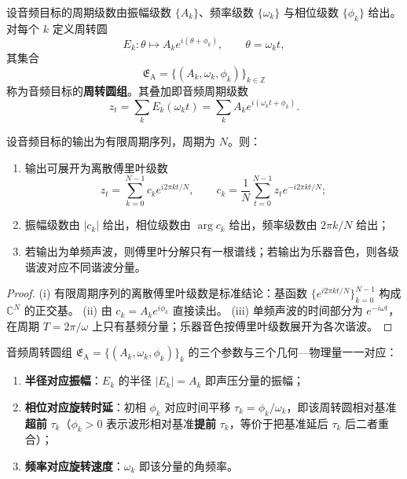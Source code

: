 \begin{definition}[音频周转圆组]\label{def:audio_epicycle_group}
设音频目标的周期级数由振幅级数 $\{A_k\}$、频率级数 $\{\omega_k\}$ 与相位级数 $\{\phi_k\}$ 给出。对每个 $k$ 定义周转圆
\[
E_k:\theta\mapsto A_k e^{i(\theta+\phi_k)},\qquad \theta=\omega_k t,
\]
其集合
\[
\mathfrak E_{\mathrm{A}}=\{(A_k,\omega_k,\phi_k)\}_{k\in\mathbb Z}
\]
称为音频目标的\textbf{周转圆组}。其叠加即音频周期级数
\[
z_t=\sum_k E_k(\omega_k t)=\sum_k A_k e^{i(\omega_k t+\phi_k)}.
\]
\end{definition}

\begin{theorem}[由音频数据构建周期级数]\label{thm:audio_series_reconstruction}
设音频目标的输出为有限周期序列，周期为 $N$。则：
\begin{enumerate}[label=(\roman*)]
    \item 输出可展开为离散傅里叶级数
    \[
    z_t=\sum_{k=0}^{N-1}c_k e^{i2\pi kt/N},\qquad
    c_k=\frac1N\sum_{t=0}^{N-1}z_t e^{-i2\pi kt/N};
    \]
    \item 振幅级数由 $|c_k|$ 给出，相位级数由 $\arg c_k$ 给出，频率级数由 $2\pi k/N$ 给出；
    \item 若输出为单频声波，则傅里叶分解只有一根谱线；若输出为乐器音色，则各级谐波对应不同谐波分量。
\end{enumerate}
\end{theorem}

\begin{proof}
(i) 有限周期序列的离散傅里叶级数是标准结论：基函数 $\{e^{i2\pi kt/N}\}_{k=0}^{N-1}$ 构成 $\mathbb C^N$ 的正交基。
(ii) 由 $c_k=A_k e^{i\phi_k}$ 直接读出。
(iii) 单频声波的时间部分为 $e^{-i\omega t}$，在周期 $T=2\pi/\omega$ 上只有基频分量；乐器音色按傅里叶级数展开为各次谐波。
\end{proof}

\begin{proposition}\label{prop:audio_epicycle_correspondence}
音频周转圆组 $\mathfrak E_{\mathrm{A}}=\{(A_k,\omega_k,\phi_k)\}_{k}$ 的三个参数与三个几何—物理量一一对应：
\begin{enumerate}[label=(\roman*)]
    \item \textbf{半径对应振幅}：$E_k$ 的半径 $|E_k|=A_k$ 即声压分量的振幅；
    \item \textbf{相位对应旋转时延}：初相 $\phi_k$ 对应时间平移 $\tau_k=\phi_k/\omega_k$，即该周转圆相对基准\textbf{超前} $\tau_k$（$\phi_k>0$ 表示波形相对基准\textbf{提前} $\tau_k$，等价于把基准延后 $\tau_k$ 后二者重合）；
    \item \textbf{频率对应旋转速度}：$\omega_k$ 即该分量的角频率。
\end{enumerate}
\end{proposition}

